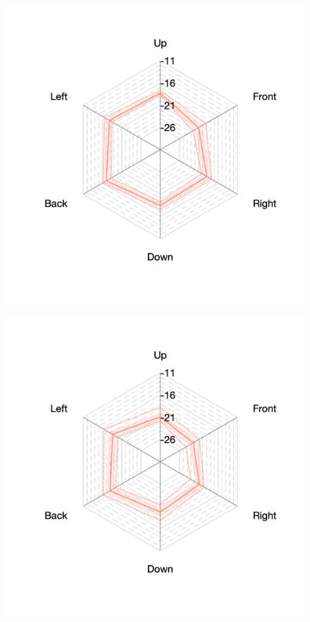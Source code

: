 \documentclass[11pt,a4j]{jreport}
\begin{document}
\begin{figure}[H]
\begin{minipage}[b]{.33\textwidth}
    \label{fig:ホールEにおけるSTEarly}
  \end{minipage}%
  \begin{minipage}[b]{.33\textwidth}
    \centering
    \includegraphics[width=1\linewidth]{images/realHallDirSt/early_hall_f_allpoints.png}
    \label{fig:ホールFにおけるSTEarly}
  \end{minipage}

  \begin{minipage}[b]{.33\textwidth}
    \centering
    \includegraphics[width=1\linewidth]{images/realHallDirSt/early_hall_g_allpoints.png}
    \label{fig:ホールGにおけるSTEarly}
  \end{minipage}


\end{figure}
\end{document}
